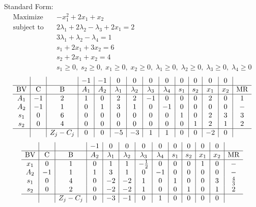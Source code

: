 \documentclass{article}
\begin{document}
Standard Form:\\
\begin{align*}
\text{Maximize} \quad & -x_{1}^{2} + 2x_{1} + x_{2}\\
\text{subject to} \quad
& 2\lambda_{1} + 2\lambda_{2} - \lambda_{3} + 2x_{1}=2\\
& 3\lambda_{1} + \lambda_{2} - \lambda_{4}=1\\
& s_{1} + 2x_{1} + 3x_{2}=6\\
& s_{2} + 2x_{1} + x_{2}=4\\
& s_{1}\ge0,\; s_{2}\ge0,\; x_{1}\ge0,\; x_{2}\ge0,\; \lambda_{1}\ge0,\; \lambda_{2}\ge0,\; \lambda_{3}\ge0,\; \lambda_{4}\ge0\end{align*}
\begin{align*}
\begin{array}{c|c|c|c|c|c|c|c|c|c|c|c|c|c}
 &  &  & -1 & -1 & 0 & 0 & 0 & 0 & 0 & 0 & 0 & 0 & \\
\hline
\text{BV} & \text{C} & \text{B} & A_{1} & A_{2} & \lambda_{1} & \lambda_{2} & \lambda_{3} & \lambda_{4} & s_{1} & s_{2} & x_{1} & x_{2} & \text{MR} \\
\hline
A_{1} & -1 & 2 & 1 & 0 & 2 & 2 & -1 & 0 & 0 & 0 & 2 & 0 & 1 \\
A_{2} & -1 & 1 & 0 & 1 & 3 & 1 & 0 & -1 & 0 & 0 & 0 & 0 & - \\
s_{1} & 0 & 6 & 0 & 0 & 0 & 0 & 0 & 0 & 1 & 0 & 2 & 3 & 3 \\
s_{2} & 0 & 4 & 0 & 0 & 0 & 0 & 0 & 0 & 0 & 1 & 2 & 1 & 2 \\
\hline
 &  & Z_j-C_j & 0 & 0 & -5 & -3 & 1 & 1 & 0 & 0 & -2 & 0 & \\
\end{array}
\end{align*}
\begin{align*}
\begin{array}{c|c|c|c|c|c|c|c|c|c|c|c|c}
 &  &  & -1 & 0 & 0 & 0 & 0 & 0 & 0 & 0 & 0 & \\
\hline
\text{BV} & \text{C} & \text{B} & A_{2} & \lambda_{1} & \lambda_{2} & \lambda_{3} & \lambda_{4} & s_{1} & s_{2} & x_{1} & x_{2} & \text{MR} \\
\hline
x_{1} & 0 & 1 & 0 & 1 & 1 & -\frac{1}{2} & 0 & 0 & 0 & 1 & 0 & - \\
A_{2} & -1 & 1 & 1 & 3 & 1 & 0 & -1 & 0 & 0 & 0 & 0 & - \\
s_{1} & 0 & 4 & 0 & -2 & -2 & 1 & 0 & 1 & 0 & 0 & 3 & \frac{4}{3} \\
s_{2} & 0 & 2 & 0 & -2 & -2 & 1 & 0 & 0 & 1 & 0 & 1 & 2 \\
\hline
 &  & Z_j-C_j & 0 & -3 & -1 & 0 & 1 & 0 & 0 & 0 & 0 & \\
\end{array}
\end{align*}
\end{document}
